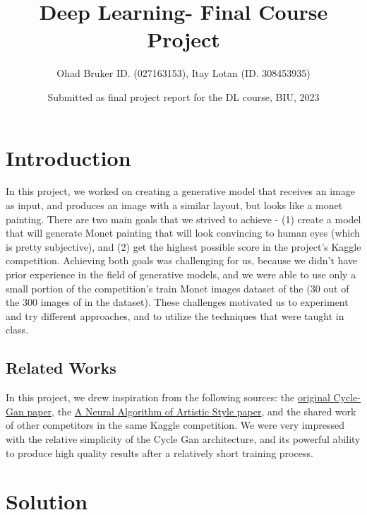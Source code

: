 \documentclass{article}
\title{Deep Learning- Final Course Project}
\author{Ohad Bruker ID. (027163153), Itay Lotan (ID. 308453935)}
\date{Submitted as final project report for the DL course, BIU, 2023}
\begin{document}
\maketitle

\section{Introduction}

In this project, we worked on creating a generative model that receives an image as input, and produces an image with a similar layout, but looks like a monet painting. There are two main goals that we strived to achieve - (1) create a model that will generate Monet painting that will look convincing to human eyes (which is pretty subjective), and (2) get the highest possible score in the project’s Kaggle competition. Achieving both goals was challenging for us, because we didn’t have prior experience in the field of generative models, and we were able to use only a small portion of the competition’s train Monet images dataset of the (30 out of the 300 images of in the dataset). These challenges motivated us to experiment and try different approaches, and to utilize the techniques that were taught in class.


\subsection{Related Works}

In this project, we drew inspiration from the following sources: the \href{https://openaccess.thecvf.com/content_ICCV_2017/papers/Zhu_Unpaired_Image-To-Image_Translation_ICCV_2017_paper.pdf}{original Cycle-Gan paper}, the \href{https://arxiv.org/pdf/1508.06576.pdf}{A Neural Algorithm of Artistic Style paper}, and the shared work of other competitors in the same Kaggle competition. We were very impressed with the relative simplicity of the Cycle Gan architecture, and its powerful ability to produce high quality results after a relatively short training process.


\section{Solution}
\end{document}

